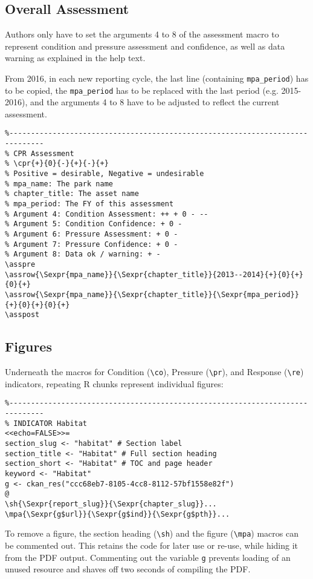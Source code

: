 \subsection*{Overall Assessment}
Authors only have to set the arguments 4 to 8 of the assessment macro to represent
condition and pressure assessment and confidence, as well as data warning as
explained in the help text.

From 2016, in each new reporting cycle, the last line (containing \texttt{mpa\_period})
has to be copied, the \texttt{mpa\_period} has to be replaced with the last period
(e.g. 2015-2016), and the arguments 4 to 8 have to be adjusted to reflect the current
assessment.

{\small\begin{verbatim}
%------------------------------------------------------------------------------
% CPR Assessment
% \cpr{+}{0}{-}{+}{-}{+}
% Positive = desirable, Negative = undesirable
% mpa_name: The park name
% chapter_title: The asset name
% mpa_period: The FY of this assessment
% Argument 4: Condition Assessment: ++ + 0 - --
% Argument 5: Condition Confidence: + 0 -
% Argument 6: Pressure Assessment: + 0 -
% Argument 7: Pressure Confidence: + 0 -
% Argument 8: Data ok / warning: + -
\asspre
\assrow{\Sexpr{mpa_name}}{\Sexpr{chapter_title}}{2013--2014}{+}{0}{+}{0}{+}
\assrow{\Sexpr{mpa_name}}{\Sexpr{chapter_title}}{\Sexpr{mpa_period}}{+}{0}{+}{0}{+}
\asspost
\end{verbatim}}

\subsection*{Figures}
Underneath the macros for Condition (\texttt{\textbackslash co}),
Pressure (\texttt{\textbackslash pr}), and Response (\texttt{\textbackslash re})
indicators, repeating R chunks represent individual figures:

{\small\begin{verbatim}
%------------------------------------------------------------------------------
% INDICATOR Habitat
<<echo=FALSE>>=
section_slug <- "habitat" # Section label
section_title <- "Habitat" # Full section heading
section_short <- "Habitat" # TOC and page header
keyword <- "Habitat"
g <- ckan_res("ccc68eb7-8105-4cc8-8112-57bf1558e82f")
@
\sh{\Sexpr{report_slug}}{\Sexpr{chapter_slug}}...
\mpa{\Sexpr{g$url}}{\Sexpr{g$ind}}{\Sexpr{g$pth}}...
\end{verbatim}}

To remove a figure, the section heading (\texttt{\textbackslash sh}) and the
figure (\texttt{\textbackslash mpa}) macros can be commented out.
This retains the code for later use or re-use, while hiding it from the PDF output.
Commenting out the variable \texttt{g} prevents loading of an unused resource and
shaves off two seconds of compiling the PDF.

